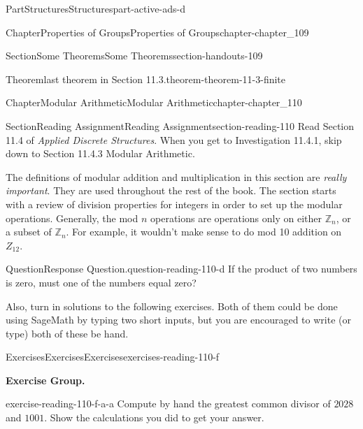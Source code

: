 \documentclass[oneside,10pt,]{book}
\numberwithin{equation}{section}
\begin{document}
\begin{partptx}{Part}{Structures}{}{Structures}{}{}{part-active-ads-d}
\begin{chapterptx}{Chapter}{Properties of Groups}{}{Properties of Groups}{}{}{chapter-chapter_109}
\begin{sectionptx}{Section}{Some Theorems}{}{Some Theorems}{}{}{section-handouts-109}
\begin{theorem}{Theorem}{last theorem in Section 11.3.}{}{theorem-theorem-11-3-finite}
\end{theorem}
\end{sectionptx}
\end{chapterptx}
%
\typeout{************************************************}
\typeout{************************************************}
%
\begin{chapterptx}{Chapter}{Modular Arithmetic}{}{Modular Arithmetic}{}{}{chapter-chapter_110}
\renewcommand*{\chaptername}{Chapter}
%
%
%
\typeout{************************************************}
\typeout{************************************************}
%
\begin{sectionptx}{Section}{Reading Assignment}{}{Reading Assignment}{}{}{section-reading-110}
Read Section 11.4 of \emph{Applied Discrete Structures}. When you get to Investigation 11.4.1, skip down to Section 11.4.3 Modular Arithmetic.%
\par
The definitions of modular addition and multiplication in this section are \emph{really important}.  They are used throughout the rest of the book.  The section starts with a review of division properties for integers in order to set up the modular operations.  Generally, the mod \(n\) operations are operations only on either \(\mathbb{Z}_n\), or a subset of \(\mathbb{Z}_n\).  For example, it wouldn't make sense to do mod 10 addition on \(Z_{12}\).%
\begin{question}{Question}{Response Question.}{question-reading-110-d}%
If the product of two numbers is zero, must one of the numbers equal zero?%
\end{question}
Also, turn in solutions to the following exercises.  Both of them could be done using SageMath by typing two short inputs, but you are encouraged to write (or type) both of these be hand.%
%
%
\typeout{************************************************}
\typeout{************************************************}
%
\begin{exercises-subsection-numberless}{Exercises}{Exercises}{}{Exercises}{}{}{exercises-reading-110-f}
\par\medskip\noindent%
\textbf{Exercise Group.}\space\space%
\begin{exercisegroup}
\begin{divisionexerciseeg}{1}{}{}{exercise-reading-110-f-a-a}%
Compute by hand the greatest common divisor of \(2028\)  and \(1001\).  Show the calculations you did to get your answer.%

\end{divisionexerciseeg}
\end{exercisegroup}
\end{exercises-subsection-numberless}
\end{sectionptx}
\end{chapterptx}
\end{partptx}
\end{document}

